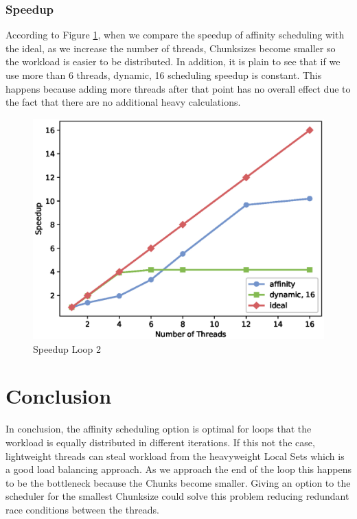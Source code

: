 \documentclass[12pt,a4paper]{article}
\newcommand{\sectionVspacing}{\vspace{15pt}}
\begin{document}
\subsubsection{Speedup}

According to Figure \ref{speedupLoop2}, when we compare the speedup of affinity scheduling with the ideal, as we increase the number of threads, Chunksizes become smaller so the workload is easier to be distributed. In addition, it is plain to see that if we use more than 6 threads, dynamic, 16 scheduling speedup is constant. This happens because adding more threads after that point has no overall effect due to the fact that there are no additional heavy calculations.

\begin{figure}[ht]
    \centering
    \includegraphics[scale=0.6]{../graphs/loop2_speedup.eps}
    \caption{Speedup Loop 2}
    \label{speedupLoop2}
\end{figure}

\sectionVspacing

\section{Conclusion}
In conclusion, the affinity scheduling option is optimal for loops that the workload is equally distributed in different iterations. If this not the case, lightweight threads can steal workload from the heavyweight Local Sets which is a good load balancing approach. As we approach the end of the loop this happens to be the bottleneck because the Chunks become smaller. Giving an option to the scheduler for the smallest Chunksize could solve this problem reducing redundant race conditions between the threads.
\end{document}
